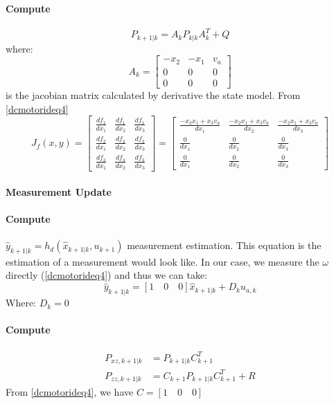 	\paragraph{Compute}
	\[P_{k+1|k} = A_kP_{k|k}A^T_k+Q\]
	where:
	\[A_k =
	\begin{bmatrix}
		-x_2 & -x_1 & v_a \\
		0    & 0    & 0   \\
		0    & 0    & 0   
	\end{bmatrix}\]
	is the jacobian matrix calculated by derivative the state model. From \autoref{dcmotorideq4}
	\[J_f(x,y) =\begin{bmatrix}
		\frac{df_1}{dx_1} & \frac{df_1}{dx_2} & \frac{df_1}{dx_3} \\
		\frac{df_2}{dx_1} & \frac{df_2}{dx_2} & \frac{df_2}{dx_3} \\
		\frac{df_3}{dx_1} & \frac{df_3}{dx_2} & \frac{df_3}{dx_3}
	\end{bmatrix} = 
	\begin{bmatrix}
		\frac{-x_2x_1+x_3v_a}{dx_1} & \frac{-x_2x_1+x_3v_a}{dx_2} & \frac{-x_2x_1+x_3v_a}{dx_3} \\
		\frac{0}{dx_1}              & \frac{0}{dx_2}              & \frac{0}{dx_3}              \\
		\frac{0}{dx_1}              & \frac{0}{dx_2}              & \frac{0}{dx_3}              
	\end{bmatrix}
	\]
	
	
	\paragraph{Measurement Update}
	\paragraph{Compute} \(\hat{y}_{k+1|k} = h_d(\hat{x}_{k+1|k},u_{k+1})\) measurement estimation. This equation is the estimation of a measurement would look like. In our case, we measure the $\omega$ directly (\autoref{dcmotorideq4}) and thus we can take:
	\[\hat{y}_{k+1|k} = [1\quad 0\quad 0]\hat{x}_{k+1|k} + D_ku_{a,k}\]
	Where: \(D_k = 0\)
	\paragraph{Compute} \[
	\begin{split}
		P_{xz,k+1|k} &= P_{k+1|k}C^T_{k+1}\\
		P_{zz,k+1|k} &= C_{k+1}P_{k+1|k}C^T_{k+1}+R
	\end{split}\]
	From \autoref{dcmotorideq4}, we have \(C = [1\quad 0\quad 0]\)

